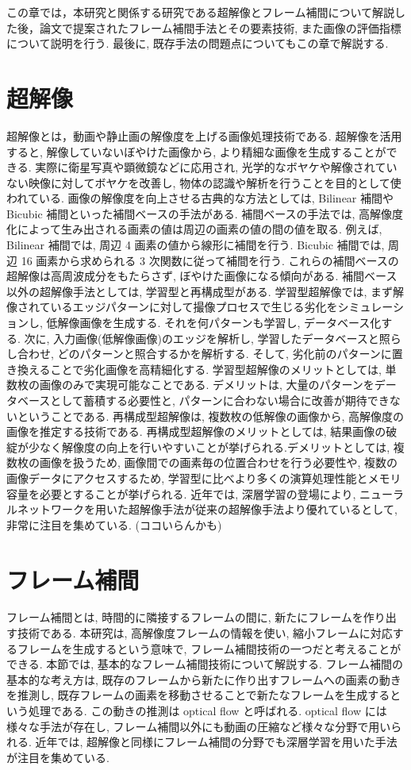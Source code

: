 \documentclass[a4paper,12pt]{jsreport}
\begin{document}
この章では，本研究と関係する研究である超解像とフレーム補間について解説した後，論文\cite{Ukihashi}で提案されたフレーム補間手法とその要素技術, また画像の評価指標について説明を行う. 最後に, 既存手法の問題点についてもこの章で解説する.

\section{超解像}
超解像とは，動画や静止画の解像度を上げる画像処理技術である. 
超解像を活用すると, 解像していないぼやけた画像から, より精細な画像を生成することができる. 実際に衛星写真や顕微鏡などに応用され, 光学的なボヤケや解像されていない映像に対してボヤケを改善し, 物体の認識や解析を行うことを目的として使われている.
画像の解像度を向上させる古典的な方法としては, Bilinear 補間や Bicubic 補間といった補間ベースの手法がある. 補間ベースの手法では, 高解像度化によって生み出される画素の値は周辺の画素の値の間の値を取る. 例えば, Bilinear 補間では, 周辺 4 画素の値から線形に補間を行う. Bicubic 補間では, 周辺 16 画素から求められる 3 次関数に従って補間を行う. これらの補間ベースの超解像は高周波成分をもたらさず, ぼやけた画像になる傾向がある.
補間ベース以外の超解像手法としては, 学習型と再構成型がある. 
学習型超解像では, まず解像されているエッジパターンに対して撮像プロセスで生じる劣化をシミュレーションし, 低解像画像を生成する. それを何パターンも学習し, データベース化する. 次に, 入力画像(低解像画像)のエッジを解析し, 学習したデータベースと照らし合わせ, どのパターンと照合するかを解析する. そして, 劣化前のパターンに置き換えることで劣化画像を高精細化する. 学習型超解像のメリットとしては, 単数枚の画像のみで実現可能なことである. デメリットは, 大量のパターンをデータベースとして蓄積する必要性と, パターンに合わない場合に改善が期待できないということである.
再構成型超解像は, 複数枚の低解像の画像から, 高解像度の画像を推定する技術である.
再構成型超解像のメリットとしては, 結果画像の破綻が少なく解像度の向上を行いやすいことが挙げられる.デメリットとしては, 複数枚の画像を扱うため, 画像間での画素毎の位置合わせを行う必要性や, 複数の画像データにアクセスするため, 学習型に比べより多くの演算処理性能とメモリ容量を必要とすることが挙げられる.
近年では, 深層学習の登場により, ニューラルネットワークを用いた超解像手法が従来の超解像手法より優れているとして, 非常に注目を集めている. (ココいらんかも)


\section{フレーム補間}
フレーム補間とは, 時間的に隣接するフレームの間に, 新たにフレームを作り出す技術である. 本研究は, 高解像度フレームの情報を使い, 縮小フレームに対応するフレームを生成するという意味で, フレーム補間技術の一つだと考えることができる. 本節では, 基本的なフレーム補間技術について解説する. フレーム補間の基本的な考え方は, 既存のフレームから新たに作り出すフレームへの画素の動きを推測し, 既存フレームの画素を移動させることで新たなフレームを生成するという処理である. この動きの推測は optical flow と呼ばれる.  optical flow には様々な手法が存在し, フレーム補間以外にも動画の圧縮など様々な分野で用いられる.
近年では, 超解像と同様にフレーム補間の分野でも深層学習を用いた手法が注目を集めている.
\end{document}
